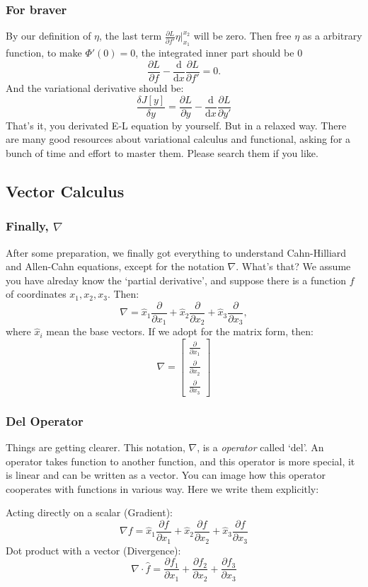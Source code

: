 \documentclass[compress]{beamer}
\begin{document}
\begin{frame}
  \frametitle{For braver}
  By our definition of \(\eta\), the last term \(\frac{\partial L}{\partial f'}\eta\Big|_{x_1}^{x_2}\) will be zero. Then free \(\eta\) as a arbitrary function, to make \(\Phi'(0) = 0\),
  the integrated inner part should be \(0\)
  \[\frac{\partial L}{\partial f}-\frac{\mathrm{d} }{\mathrm{d} x}\frac{\partial L}{\partial f'} = 0.\]
  And the variational derivative should be:
  \[
    \frac{\delta J[y]}{\delta y} = \frac{\partial L}{\partial y}-\frac{\mathrm{d} }{\mathrm{d} x}\frac{\partial L}{\partial y'}
  \]
  That's it, you derivated E-L equation by yourself. But in a relaxed way. There are many good resources about variational calculus and
  functional, asking for a bunch of time and effort to master them. Please search them if you like.
\end{frame}


\subsection{Vector Calculus}
\begin{frame}
  \frametitle{Finally, \(\nabla\)}
  After some preparation, we finally got everything to understand Cahn-Hilliard and Allen-Cahn equations, except for the
  notation \(\nabla\). What's that? We assume you have alreday know the `partial derivative', and suppose there is a function \(f\)
  of coordinates \(x_1,x_2,x_3\). Then:
  \[\nabla = \hat{x}_1 \frac{\partial }{\partial x_1} + \hat{x}_2\frac{\partial }{\partial x_2}+\hat{x}_3\frac{\partial }{\partial x_3},\]
  where \(\hat{x}_i\) mean the base vectors. If we adopt for the matrix form, then:
  \[
    \nabla =
    \begin{bmatrix}
      \frac{\partial }{\partial x_1} \\
      \frac{\partial }{\partial x_2} \\
      \frac{\partial }{\partial x_3}
    \end{bmatrix}
  \]
\end{frame}

\begin{frame}
  \frametitle{Del Operator}
  Things are getting clearer. This notation, \(\nabla\), is a \emph{operator} called `del'. An operator takes function to another function, and this
  operator is more special, it is linear and can be written as a vector. You can image how this operator cooperates with functions in various way. Here
  we write them explicitly:

  Acting directly on a scalar (Gradient):
  \[\nabla f = \hat{x}_1 \frac{\partial f}{\partial x_1} + \hat{x}_2\frac{\partial f}{\partial x_2}+\hat{x}_3\frac{\partial f}{\partial x_3}\]
  Dot product with a vector (Divergence):
  \[\nabla \cdot \hat{f} = \frac{\partial f_1}{\partial x_1} + \frac{\partial f_2}{\partial x_2}+\frac{\partial f_3}{\partial x_3}\]
\end{frame}
\end{document}
